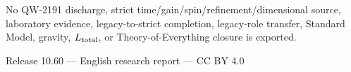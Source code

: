 \documentclass[11pt,a4paper]{article}
\begin{document}
No QW-2191 discharge, strict time/gain/spin/refinement/dimensional source, laboratory evidence, legacy-to-strict completion, legacy-role transfer, Standard Model, gravity, $L_{\rm total}$, or Theory-of-Everything closure is exported.

\vfill
\begin{center}
\small Release 10.60 --- English research report --- CC BY 4.0
\end{center}
\end{document}
